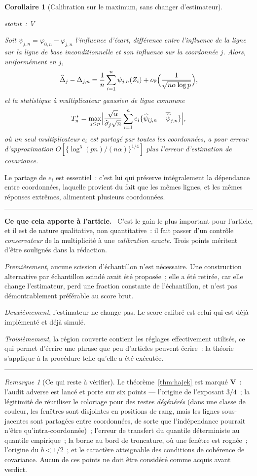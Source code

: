 \documentclass[11pt]{article}
\theoremstyle{plain}
\newtheorem{corollaire}[theoreme]{Corollaire}
\theoremstyle{definition}
\theoremstyle{remark}
\newtheorem{remarque}[theoreme]{Remarque}
\newcommand{\Pp}{\mathbb P}
\newcommand{\1}{\mathbf 1}
\newcommand{\statut}[1]{%
  \nopagebreak\par\nopagebreak
  \hfill{\normalfont\footnotesize\textcolor{gris}{statut~: #1}}%
  \par\nopagebreak\vspace{-2pt}}
\newenvironment{apport}
  {\par\medskip\noindent\begingroup\color{bleu}\rule{\linewidth}{0.6pt}\par
   \nobreak\vspace{2pt}\noindent\textbf{Ce que cela apporte à l'article.}\ \normalcolor}
  {\par\vspace{2pt}\noindent\textcolor{bleu}{\rule{\linewidth}{0.6pt}}\endgroup\par\medskip}
\begin{document}
\begin{corollaire}[Calibration sur le maximum, sans changer d'estimateur]
\label{cor:calibration}
\statut{V}
Soit $\psi_{j,n}=\varphi_{0,n}-\varphi_{j,n}$ l'\emph{influence d'écart},
différence entre l'influence de la ligne sur la ligne de base
inconditionnelle et son influence sur la coordonnée $j$. Alors,
uniformément en $j$,
\[
 \widehat\Delta_j-\Delta_{j,n}
 =\frac1n\sum_{i=1}^n\psi_{j,n}(Z_i)
 +o_\Pp\Bigl(\frac1{\sqrt{n\alpha\log p}}\Bigr),
\]
et la statistique à multiplicateur gaussien de \emph{ligne commune}
\[
 T^\ast_n=\max_{j\le p}\Bigl|\frac{\sqrt{\alpha}}{\widehat\sigma_j\sqrt n}
 \sum_{i=1}^ne_i\{\widehat\psi_{ij,n}-\overline{\widehat\psi}_{j,n}\}\Bigr|,
\]
où un seul multiplicateur $e_i$ est partagé par toutes les coordonnées,
a pour erreur d'approximation
$O[\{\log^5(pn)/(n\alpha)\}^{1/4}]$ plus l'erreur d'estimation de
covariance.
\end{corollaire}

\noindent
Le partage de $e_i$ est essentiel~: c'est lui qui préserve intégralement
la dépendance entre coordonnées, laquelle provient du fait que les mêmes
lignes, et les mêmes réponses extrêmes, alimentent plusieurs coordonnées.

\begin{apport}
C'est le gain le plus important pour l'article, et il est de nature
qualitative, non quantitative~: il fait passer d'un contrôle
\emph{conservateur} de la multiplicité à une \emph{calibration exacte}.
Trois points méritent d'être soulignés dans la rédaction.

\smallskip
\emph{Premièrement}, aucune scission d'échantillon n'est nécessaire. Une
construction alternative par échantillon scindé avait été proposée~; elle
a été retirée, car elle change l'estimateur, perd une fraction constante
de l'échantillon, et n'est pas démontrablement préférable au score brut.

\smallskip
\emph{Deuxièmement}, l'estimateur ne change pas. Le score calibré est
celui qui est déjà implémenté et déjà simulé.

\smallskip
\emph{Troisièmement}, la région couverte contient les réglages
effectivement utilisés, ce qui permet d'écrire une phrase que peu
d'articles peuvent écrire~: la théorie s'applique à la procédure telle
qu'elle a été exécutée.
\end{apport}

\begin{remarque}[Ce qui reste à vérifier]
Le théorème~\ref{thm:hajek} est marqué \textbf{V}~: l'audit adverse est
lancé et porte sur six points --- l'origine de l'exposant $3/4$~; la
légitimité de réutiliser le coloriage pour des restes \emph{dégénérés}
(dans une classe de couleur, les fenêtres sont disjointes en positions de
rang, mais les lignes sous-jacentes sont partagées entre coordonnées, de
sorte que l'indépendance pourrait n'être qu'intra-coordonnée)~; l'erreur
de transfert du quantile déterministe au quantile empirique~; la borne au
bord de troncature, où une fenêtre est rognée~; l'origine du $b<1/2$~; et
le caractère atteignable des conditions de cohérence de covariance.
Aucun de ces points ne doit être considéré comme acquis avant verdict.
\end{remarque}
\end{document}
